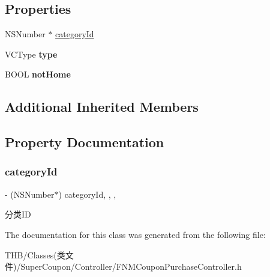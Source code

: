 \subsection*{Properties}
\begin{DoxyCompactItemize}
\item 
N\+S\+Number $\ast$ \mbox{\hyperlink{interface_f_n_m_coupon_purchase_controller_ab573bae184280b3abb9ec830d7c3f583}{category\+Id}}
\item 
\mbox{\label{interface_f_n_m_coupon_purchase_controller_a1fc3fcf23259aa62c25ab557fc286992}} 
V\+C\+Type {\bfseries type}
\item 
\mbox{\label{interface_f_n_m_coupon_purchase_controller_aed5fb47703969e5b455fe87322271a99}} 
B\+O\+OL {\bfseries not\+Home}
\end{DoxyCompactItemize}
\subsection*{Additional Inherited Members}


\subsection{Property Documentation}
\mbox{\label{interface_f_n_m_coupon_purchase_controller_ab573bae184280b3abb9ec830d7c3f583}} 
\subsubsection{\texorpdfstring{category\+Id}{categoryId}}
{\footnotesize\ttfamily -\/ (N\+S\+Number$\ast$) category\+Id\hspace{0.3cm}{\ttfamily [read]}, {\ttfamily [write]}, {\ttfamily [nonatomic]}, {\ttfamily [assign]}}

分类\+ID 

The documentation for this class was generated from the following file\+:\begin{DoxyCompactItemize}
\item 
T\+H\+B/\+Classes(类文件)/\+Super\+Coupon/\+Controller/F\+N\+M\+Coupon\+Purchase\+Controller.\+h\end{DoxyCompactItemize}
